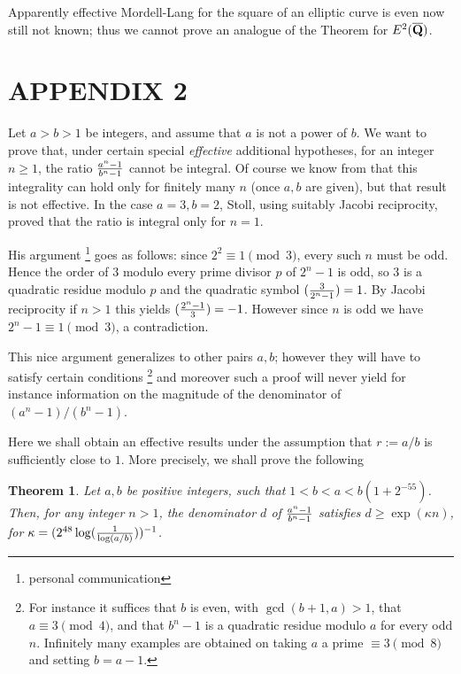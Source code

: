 \documentclass[leqno,12pt]{article} %
\theoremstyle{plain} %
\newtheorem{theorem}{\indent\sc Theorem}[section]
\theoremstyle{definition} %
\begin{document}
Apparently effective Mordell-Lang for the square of an elliptic curve is even now still
not known; thus we cannot prove an analogue of the Theorem for $E^2(\overline{\bf Q})$.

 
\vglue 2cm


\pagebreak


\section*{APPENDIX 2}

Let $a>b>1$ be integers, and assume that $a$ is not a power of $b$.  We want to prove that, under certain special {\it effective} additional hypotheses, for an integer $n\ge 1$,  the ratio ${a^n-1\over b^n-1}$ cannot be integral. %
Of course we know from \cite{BCZ}  that this integrality can hold only for finitely many $n$ (once $a,b$ are given), but that result is not effective.  In the case $a=3,b=2$, {\sc Stoll}, using suitably Jacobi reciprocity, proved   that the ratio is integral only for $n=1$. 

His argument \footnote{personal communication}  goes as follows: since $2^2\equiv 1\pmod 3$, every such $n$ must be odd. Hence the order of $3$ modulo every prime divisor  $p$ of $2^n-1$ is odd, so $3$ is a quadratic residue modulo $p$ and the quadratic symbol $({3\over 2^n-1})=1$. By Jacobi reciprocity if $n>1$ this yields $({2^n-1\over 3})=-1$. However since $n$ is odd we have $2^n-1\equiv 1\pmod 3$, a contradiction. 


This nice argument  
  generalizes to other pairs $a,b$; however they will have to  satisfy certain   conditions \footnote{For instance it suffices  that $b$ is even,  with $\gcd(b+1,a)>1$, that $a\equiv 3\pmod 4$, and  that $b^n-1$ is a quadratic residue modulo  $a$ for every odd $n$. Infinitely many examples are obtained on taking $a$ a prime $\equiv 3\pmod 8$ and setting $b=a-1$.} and moreover such a proof will never yield for instance information on the magnitude of the denominator of $(a^n-1)/(b^n-1)$. 

\medskip

Here we shall obtain an effective results under the assumption that $r:=a/b$ is sufficiently close to $1$.   More precisely, we shall prove the following

\begin{theorem} Let $a,b$ be positive integers, such that $1<b<a<b(1+2^{-55})$. Then, for any integer $n>1$,  the denominator $d$ of ${a^n-1\over b^n-1}$ satisfies $d\ge \exp( \kappa n)$, for $\kappa=(2^{48}\log({1\over \log (a/b)}))^{-1}$.
\end{theorem}
\end{document}
